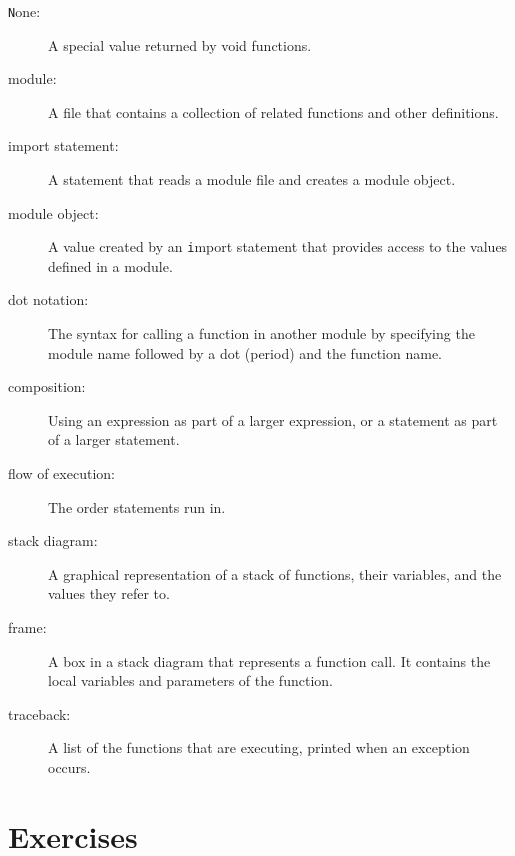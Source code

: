 \documentclass[
DIV=11,
fontsize=13,
twoside,
headinclude=false,
titlepage=firstiscover,
abstract=true,
headsepline=true,
footsepline=true,
chapterprefix=true, %
headings=big,
bibliography=totoc,%
captions=tableheading
]{scrbook}
\theoremstyle{definition}
\begin{document}
\begin{description}
\item[{\texttt None}:]  A special value returned by void functions.

\item[module:] A file that contains a
collection of related functions and other definitions.

\item[import statement:] A statement that reads a module file and creates
a module object.

\item[module object:] A value created by an {\texttt import} statement
that provides access to the values defined in a module.

\item[dot notation:]  The syntax for calling a function in another
module by specifying the module name followed by a dot (period) and
the function name.

\item[composition:] Using an expression as part of a larger expression,
or a statement as part of a larger statement.

\item[flow of execution:]  The order statements run in.

\item[stack diagram:]  A graphical representation of a stack of functions,
their variables, and the values they refer to.

\item[frame:]  A box in a stack diagram that represents a function call.
It contains the local variables and parameters of the function.

\item[traceback:]  A list of the functions that are executing,
printed when an exception occurs.


\end{description}


\section{Exercises}
\end{document}
